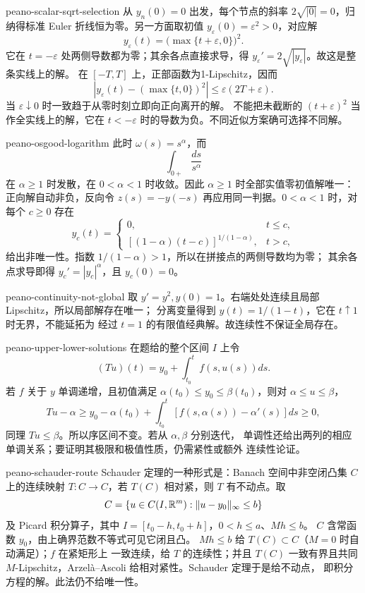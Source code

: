 \begin{solution}{peano-scalar-sqrt-selection}
从 \(y_n(0)=0\) 出发，每个节点的斜率 \(2\sqrt{|0|}=0\)，归纳得标准 Euler
折线恒为零。另一方面取初值 \(y_\varepsilon(0)=\varepsilon^2>0\)，对应解
\[
 y_\varepsilon(t)=\bigl(\max\{t+\varepsilon,0\}\bigr)^2.
\]
它在 \(t=-\varepsilon\) 处两侧导数都为零；其余各点直接求导，得
\(y_\varepsilon'=2\sqrt{|y_\varepsilon|}\)。故这是整条实线上的解。
在 \([-T,T]\) 上，正部函数为1-Lipschitz，因而
\[
 |y_\varepsilon(t)-(\max\{t,0\})^2|
 \le\varepsilon(2T+\varepsilon).
\]
当 \(\varepsilon\downarrow0\) 时一致趋于从零时刻立即向正向离开的解。
不能把未截断的 \((t+\varepsilon)^2\) 当作全实线上的解，它在
\(t<-\varepsilon\) 时的导数为负。不同近似方案确可选择不同解。
\end{solution}

\begin{solution}{peano-osgood-logarithm}
此时 \(\omega(s)=s^\alpha\)，而
\[
 \int_{0+}\frac{ds}{s^\alpha}
\]
在 \(\alpha\ge1\) 时发散，在 \(0<\alpha<1\) 时收敛。因此
\(\alpha\ge1\) 时全部实值零初值解唯一：正向解自动非负，反向令
\(z(s)=-y(-s)\) 再应用同一判据。\(0<\alpha<1\) 时，对每个 \(c\ge0\) 存在
\[
 y_c(t)=
 \begin{cases}
 0,&t\le c,\\
 [(1-\alpha)(t-c)]^{1/(1-\alpha)},&t>c,
 \end{cases}
\]
给出非唯一性。指数 \(1/(1-\alpha)>1\)，所以在拼接点的两侧导数均为零；
其余各点求导即得 \(y_c'=|y_c|^\alpha\)，且 \(y_c(0)=0\)。
\end{solution}

\begin{solution}{peano-continuity-not-global}
取 \(y'=y^2,y(0)=1\)。右端处处连续且局部 Lipschitz，所以局部解存在唯一；
分离变量得到 \(y(t)=1/(1-t)\)，它在 \(t\uparrow1\) 时无界，不能延拓为
经过 \(t=1\) 的有限值经典解。故连续性不保证全局存在。
\end{solution}

\begin{solution}{peano-upper-lower-solutions}
在题给的整个区间 \(I\) 上令
\[
 (Tu)(t)=y_0+\int_{t_0}^{t}f(s,u(s))ds.
\]
若 \(f\) 关于 \(y\) 单调递增，且初值满足
\(\alpha(t_0)\le y_0\le\beta(t_0)\)，则对
\(\alpha\le u\le\beta\)，
\[
 Tu-\alpha
 \ge y_0-\alpha(t_0)+\int_{t_0}^{t}
 [f(s,\alpha(s))-\alpha'(s)]ds\ge0,
\]
同理 \(Tu\le\beta\)。所以序区间不变。若从 \(\alpha,\beta\) 分别迭代，
单调性还给出两列的相应单调关系；要证明其极限和极值性质，仍需紧性或额外
连续性论证。
\end{solution}

\begin{solution}{peano-schauder-route}
Schauder 定理的一种形式是：Banach 空间中非空闭凸集 \(C\) 上的连续映射
\(T:C\to C\)，若 \(T(C)\) 相对紧，则 \(T\) 有不动点。取
\[
 C=\{u\in C(I,\mathbb{R}^m):\|u-y_0\|_\infty\le b\}
\]
及 Picard 积分算子，其中 \(I=[t_0-h,t_0+h]\)，\(0<h\le a\)、\(Mh\le b\)。
\(C\) 含常函数 \(y_0\)，由上确界范数不等式可见它闭且凸。
\(Mh\le b\) 给 \(T(C)\subset C\)（\(M=0\) 时自动满足）；\(f\) 在紧矩形上
一致连续，给 \(T\) 的连续性；并且 \(T(C)\) 一致有界且共同
\(M\)-Lipschitz，Arzelà--Ascoli 给相对紧性。Schauder 定理于是给不动点，
即积分方程的解。此法仍不给唯一性。
\end{solution}
